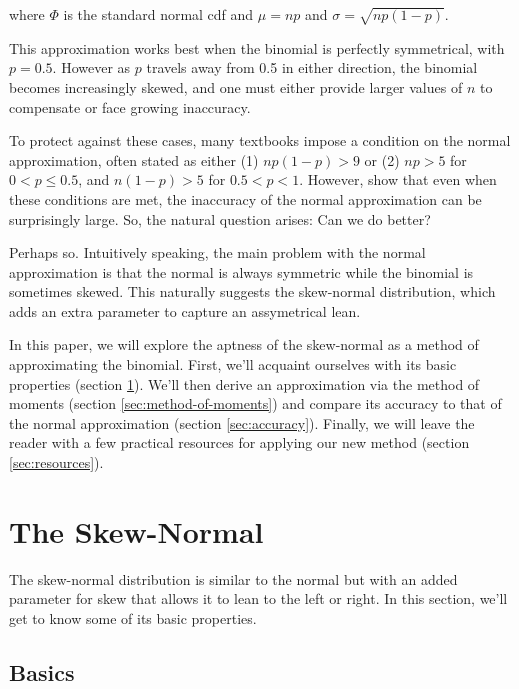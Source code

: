 \documentclass{article}
\begin{document}
where $\Phi$ is the standard normal cdf and $\mu = np$ and $\sigma =
\sqrt{np(1-p)}$.

This approximation works best when the binomial is perfectly symmetrical, with
$p=0.5$. However as $p$ travels away from 0.5 in either direction, the binomial
becomes increasingly skewed, and one must either provide larger values of $n$
to compensate or face growing inaccuracy.

To protect against these cases, many textbooks impose a condition on the normal
approximation, often stated as either (1) $np(1-p) > 9$ \; or \; (2) $np > 5$
for $0 < p \leq 0.5$, and $n(1-p) > 5$ for $0.5 < p < 1$. However, \citet{mabs}
show that even when these conditions are met, the inaccuracy of the normal
approximation can be surprisingly large. So, the natural question arises: Can
we do better?

Perhaps so. Intuitively speaking, the main problem with the normal
approximation is that the normal is always symmetric while the binomial is
sometimes skewed. This naturally suggests the skew-normal distribution, which
adds an extra parameter to capture an assymetrical lean.

In this paper, we will explore the aptness of the skew-normal as a method of
approximating the binomial. First, we'll acquaint ourselves with its basic
properties (section \ref{sec:properties}). We'll then derive an approximation
via the method of moments (section \ref{sec:method-of-moments}) and compare its
accuracy to that of the normal approximation (section \ref{sec:accuracy}).
Finally, we will leave the reader with a few practical resources for applying
our new method (section \ref{sec:resources}).

\section{The Skew-Normal}
\label{sec:properties}

The skew-normal distribution is similar to the normal but with an added
parameter for skew that allows it to lean to the left or right. In this
section, we'll get to know some of its basic properties.

\subsection{Basics}
\end{document}
